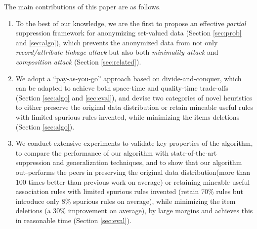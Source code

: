 
The main contributions of this paper are as follows.
\begin{enumerate}
\item To the best of our knowledge, we are the first to propose an
    effective \emph{partial} suppression framework for anonymizing
    set-valued data (Section \ref{sec:prob} and
    \ref{sec:algo}), which %
    prevents
    the anonymized data from not only {\em record/attribute linkage
    attack} \cite{FungWCY10:Survey} but also both {\em minimality
    attack} \cite{Wong:2007:Minimality} and {\em composition attack}
    \cite{Ganta:2008:Composition} (Section \ref{sec:related}).
\item We adopt a ``pay-as-you-go'' approach based on divide-and-conquer,
    which can be adapted to achieve both space-time and quality-time
    trade-offs (Section \ref{sec:algo} and \ref{sec:eval}), and devise two
    categories of novel heuristics to either preserve the original data
    distribution or retain mineable useful rules with limited spurious
    rules invented, while minimizing the items deletions (Section
    \ref{sec:algo}).
\item We conduct extensive experiments to validate key properties of the
    algorithm, to compare the performance of our algorithm with
    state-of-the-art suppression and generalization techniques, and to
    show that our algorithm out-performs the peers in preserving the
    original data distribution(more than 100 times better 
    than previous work on average) 
    or retaining mineable useful association
    rules with limited spurious rules invented (retain 70\% rules 
    but introduce only 8\% spurious rules on average),
     while minimizing the item
    deletions (a 30\% improvement on average), by large margins and 
    achieves this in reasonable time (Section \ref{sec:eval}).
\end{enumerate}


